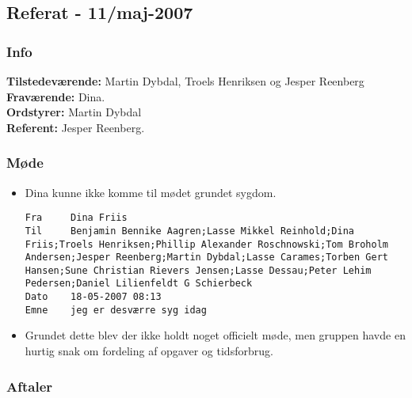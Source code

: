 \subsection{Referat - 11/maj-2007}

\subsubsection{Info}

\textbf{Tilstedeværende:} Martin Dybdal, Troels Henriksen og Jesper Reenberg\\
\textbf{Fraværende:} Dina.\\
\textbf{Ordstyrer:} Martin Dybdal\\
\textbf{Referent:} Jesper Reenberg.

\subsubsection{Møde}

\begin{itemize}

\item Dina kunne ikke komme til mødet grundet sygdom.
\begin{verbatim}
Fra 	Dina Friis
Til 	Benjamin Bennike Aagren;Lasse Mikkel Reinhold;Dina Friis;Troels Henriksen;Phillip Alexander Roschnowski;Tom Broholm Andersen;Jesper Reenberg;Martin Dybdal;Lasse Carames;Torben Gert Hansen;Sune Christian Rievers Jensen;Lasse Dessau;Peter Lehim Pedersen;Daniel Lilienfeldt G Schierbeck
Dato 	18-05-2007 08:13
Emne 	jeg er desværre syg idag
\end{verbatim}


\item Grundet dette blev der ikke holdt noget officielt møde, men gruppen havde en hurtig snak om fordeling af opgaver og tidsforbrug.

\end{itemize}

\subsubsection{Aftaler}

